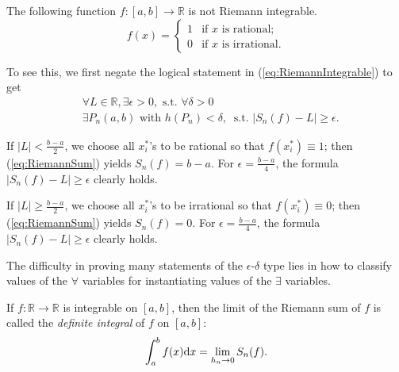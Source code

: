 \begin{exm}
  The following function $f:[a,b]\rightarrow \mathbb{R}$
   is not Riemann integrable.
   \begin{equation}
     \label{eq:rationalVsIrr}
     f(x)=
     \begin{cases}
       1 & \text{if $x$ is rational};
       \\
       0 & \text{if $x$ is irrational}.
     \end{cases}
   \end{equation}

  To see this, we first
   negate the logical statement in (\ref{eq:RiemannIntegrable})
   to get
  \begin{align*}
    &\forall L\in\mathbb{R},
      \exists \epsilon>0, \text{ s.t. } \forall \delta>0 
    \\
    & \exists P_n(a,b) \text{ with } h(P_n)<\delta,\ 
      \text{ s.t. } |S_n(f)-L|\ge \epsilon.
  \end{align*}
  
  If $|L|< \frac{b-a}{2}$,
  we choose all $x_i^*$'s to be rational
  so that $f(x_i^*)\equiv 1$;
  then (\ref{eq:RiemannSum}) yields $S_n(f)=b-a$.
  For $\epsilon=\frac{b-a}{4}$,
   the formula $|S_n(f)-L|\ge \epsilon$ clearly holds.
  
  If $|L|\ge \frac{b-a}{2}$,
  we choose all $x_i^*$'s to be irrational
  so that $f(x_i^*)\equiv 0$;
  then (\ref{eq:RiemannSum}) yields $S_n(f)=0$.
  For $\epsilon=\frac{b-a}{4}$,
   the formula $|S_n(f)-L|\ge \epsilon$ clearly holds.
\end{exm}

\begin{rem}
  The difficulty in proving many statements of the $\epsilon$-$\delta$ type
  lies in how to classify values of the $\forall$ variables
  for instantiating values of the $\exists$ variables.
\end{rem}

\begin{defn}
  \label{def:definiteIntegral}
  If $f: \mathbb{R}\rightarrow \mathbb{R}$
   is integrable on $[a, b]$,
   then the limit of the Riemann sum of $f$
   is called the \emph{definite integral}
   of $f$ on $[a, b]$:
   \begin{equation}
     \label{eq:definiteIntegral}
     \int_a^b f(x)\mathrm{d} x
     = \lim_{h_n\rightarrow 0} S_n(f).
   \end{equation}
\end{defn}

